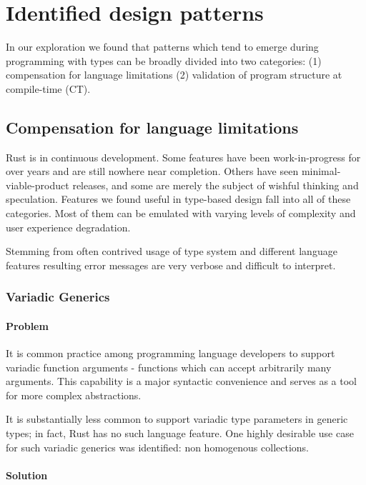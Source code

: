 \section{Identified design patterns}

In our exploration we found that patterns which tend to emerge during programming with types can be broadly divided into two categories: (1) compensation for language limitations (2) validation of program structure at compile-time (CT).

\subsection{Compensation for language limitations}

Rust is in continuous development. 
Some features have been work-in-progress for over years and are still nowhere near completion. 
Others have seen minimal-viable-product releases, and some are merely the subject of wishful thinking and speculation. 
Features we found useful in type-based design fall into all of these categories. 
Most of them can be emulated with varying levels of complexity and user experience degradation.

Stemming from often contrived usage of type system and different language features
resulting error messages are very verbose and difficult to interpret.

\subsubsection{Variadic Generics}

\paragraph{Problem}

It is common practice among programming language developers to support variadic function arguments - functions which can accept arbitrarily many arguments.
This capability is a major syntactic convenience and serves as a tool for more complex abstractions.

It is substantially less common to support variadic type parameters in generic types; in fact, Rust has no such language feature.
One highly desirable use case for such variadic generics was identified: non homogenous collections. 

\paragraph{Solution}

